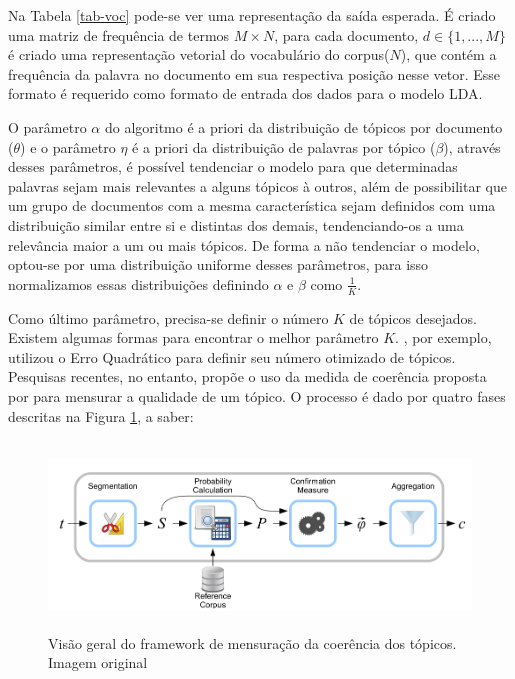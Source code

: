\documentclass[12pt,a4paper]{article}
\begin{document}
Na Tabela \ref{tab-voc} pode-se ver uma representação da saída esperada. É criado uma matriz de frequência de termos $M \times N$, para cada documento,
 $d \in \{1,. . . , M\}$ é criado uma representação vetorial do vocabulário do corpus($N$), que contém a frequência da palavra no documento em sua respectiva posição nesse vetor.
 Esse formato é requerido como formato de entrada dos dados para o modelo LDA.

O parâmetro $\alpha$ do algoritmo é a priori da distribuição de tópicos por documento ($\theta$) e o parâmetro $\eta$ é a priori da distribuição de palavras por tópico ($\beta$),
 através desses parâmetros, é possível tendenciar o modelo para que determinadas palavras sejam mais relevantes a alguns tópicos à outros,
 além de possibilitar que um grupo de documentos com a mesma característica sejam definidos com uma distribuição similar entre si e distintas dos demais,
 tendenciando-os a uma relevância maior a um ou mais tópicos. De forma a não tendenciar o modelo, optou-se por uma distribuição uniforme desses parâmetros,
 para isso normalizamos essas distribuições definindo $\alpha$ e $\beta$ como $\frac{1}{K}$.

Como último parâmetro, precisa-se definir o número $K$ de tópicos desejados. Existem algumas formas para encontrar o melhor parâmetro $K$.  , por exemplo, utilizou o Erro Quadrático para definir seu número otimizado de tópicos. Pesquisas recentes, no entanto,
 propõe o uso da medida de coerência proposta por  para mensurar a qualidade de um tópico. O processo é dado por quatro fases descritas na Figura \ref{fig-proc}, a saber:


\begin{figure}[H]
	\centering
    \includegraphics[height=5cm]{images/figure_3.png}
    \caption{Visão geral do framework de mensuração da coerência dos tópicos. Imagem original }
    \label{fig-proc}

\end{figure}
\end{document}
